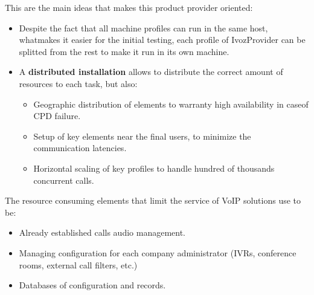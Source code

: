 \documentclass[letterpaper,10pt,english]{sphinxmanual}
\begin{document}
This are the main ideas that makes this product provider oriented:
\begin{itemize}
\item {} 
Despite the fact that all machine profiles can run in the same host,
whatmakes it easier for the initial testing, each profile of IvozProvider
can be splitted from the rest to make it run in its own machine.

\item {} 
A \textbf{distributed installation} allows to distribute the correct amount of
resources to each task, but also:
\begin{itemize}
\item {} 
Geographic distribution of elements to warranty high availability in
caseof CPD failure.

\item {} 
Setup of key elements near the final users, to minimize the communication
latencies.

\item {} 
Horizontal scaling of key profiles to handle hundred of thousands
concurrent calls.

\end{itemize}

\end{itemize}

The resource consuming elements that limit the service of VoIP solutions
use to be:
\begin{itemize}
\item {} 
Already established calls audio management.

\item {} 
Managing configuration for each company administrator (IVRs, conference
rooms, external call filters, etc.)

\item {} 
Databases of configuration and records.

\end{itemize}
\end{document}
